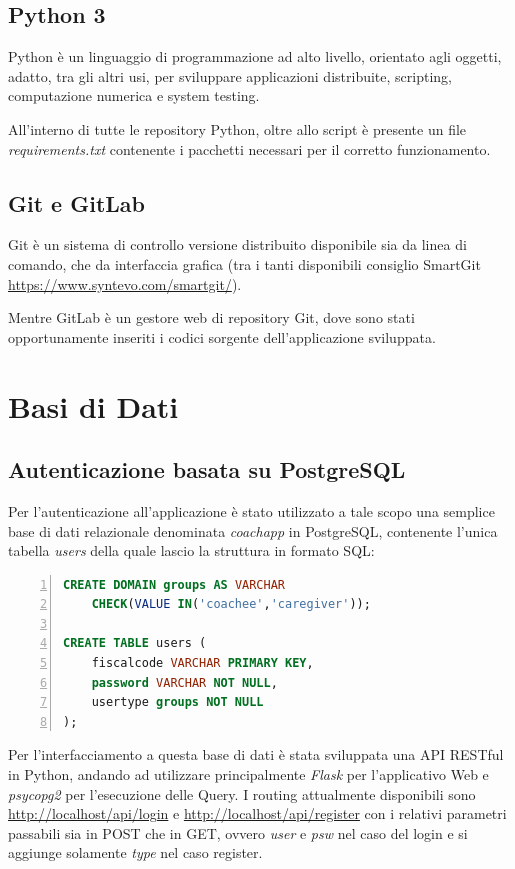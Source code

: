 \documentclass[a4paper,titlepage]{book}
\begin{document}
\section{Python 3}
Python \`{e} un linguaggio di programmazione ad alto livello, orientato agli oggetti, adatto, tra gli altri usi, per sviluppare applicazioni distribuite, scripting, computazione numerica e system testing. 

All'interno di tutte le repository Python, oltre allo script \`{e} presente un file \textit{requirements.txt} contenente i pacchetti necessari per il corretto funzionamento.

\section{Git e GitLab}
Git \`{e} un sistema di controllo versione distribuito disponibile sia da linea di comando, che da interfaccia grafica (tra i tanti disponibili consiglio SmartGit \url{https://www.syntevo.com/smartgit/}).

Mentre GitLab \`{e} un gestore web di repository Git, dove sono stati opportunamente inseriti i codici sorgente dell'applicazione sviluppata.

\chapter{Basi di Dati}

\section{Autenticazione basata su PostgreSQL}
Per l'autenticazione all'applicazione \`{e} stato utilizzato a tale scopo una semplice base di dati relazionale denominata \textit{coachapp} in PostgreSQL, contenente l'unica tabella \textit{users} della quale lascio la struttura in formato SQL:
\begin{lstlisting}[language=SQL,
           showspaces=false,
           basicstyle=\ttfamily,
           numbers=left,
           numberstyle=\tiny,
           commentstyle=\color{gray}]
CREATE DOMAIN groups AS VARCHAR 
	CHECK(VALUE IN('coachee','caregiver'));
	
CREATE TABLE users (
	fiscalcode VARCHAR PRIMARY KEY,
	password VARCHAR NOT NULL,
	usertype groups NOT NULL
);
\end{lstlisting}

Per l'interfacciamento a questa base di dati \`{e} stata sviluppata una API RESTful in Python, andando ad utilizzare principalmente \textit{Flask} per l'applicativo Web e \textit{psycopg2} per l'esecuzione delle Query. I routing attualmente disponibili sono \url{http://localhost/api/login} e \url{http://localhost/api/register} con i relativi parametri passabili sia in POST che in GET, ovvero \textit{user} e \textit{psw} nel caso del login e si aggiunge solamente \textit{type} nel caso register.
\end{document}
